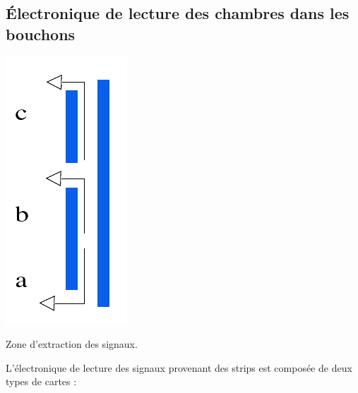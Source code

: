 \subsection{Électronique de lecture des chambres dans les bouchons}
\label{elecc}
\vspace{-0.2cm}
\marginpar
{
	\centering
	\includegraphics[width=\marginparwidth]{RPC/signalextraction.png}
	\captionsetup{type=figure}\caption{Zone d'extraction des signaux.}
	\label{extraction}
}
L'électronique de lecture des signaux provenant des strips est composée de deux types de cartes :
